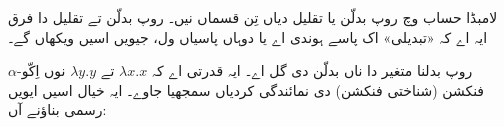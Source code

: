 \documentclass[../../../include/open-logic-section]{subfiles}
\begin{document}

لامبڈا حساب وچ روپ بدلّن یا تقلیل دیاں تِن قسماں نیں۔ روپ بدلّن تے تقلیل دا فرق ایہ اے کہ «تبدیلی» اک پاسے ہوندی اے یا دوہاں پاسیاں ول، جیویں اسیں ویکھاں گے۔

$\alpha$-روپ بدلنا متغیر دا ناں بدلّن دی گل اے۔ ایہ قدرتی اے کہ $\lambda x. x$ تے $\lambda y.y$ نوں اِکّو فنکشن (شناختی فنکشن) دی نمائندگی کردیاں سمجھیا جاوے۔ ایہ خیال اسیں ایویں رسمی بناؤنے آں:
\end{document}
